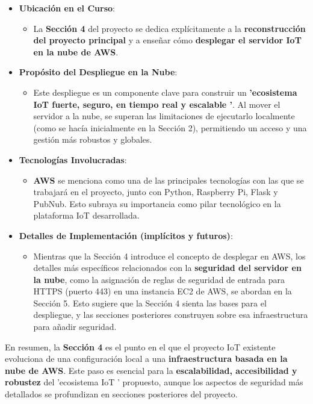 \documentclass{report}
\begin{document}
\begin{itemize}
    \item \textbf{Ubicación en el Curso}:
    \begin{itemize}
        \item La \textbf{Sección 4} del proyecto se dedica explícitamente a la \textbf{reconstrucción del proyecto principal} y a enseñar cómo 
        \textbf{desplegar el servidor IoT en la nube de AWS}.
    \end{itemize}

    \item \textbf{Propósito del Despliegue en la Nube}:
    \begin{itemize}
        \item Este despliegue es un componente clave para construir un \textbf{ 'ecosistema IoT fuerte, seguro, en tiempo real y escalable '}. 
        Al mover el servidor a la nube, se superan las limitaciones de ejecutarlo localmente (como se hacía inicialmente en la Sección 2), 
        permitiendo un acceso y una gestión más robustos y globales.
    \end{itemize}

    \item \textbf{Tecnologías Involucradas}:
    \begin{itemize}
        \item \textbf{AWS} se menciona como una de las principales tecnologías con las que se trabajará en el proyecto, junto con Python, Raspberry Pi, 
        Flask y PubNub. Esto subraya su importancia como pilar tecnológico en la plataforma IoT desarrollada.
    \end{itemize}

    \item \textbf{Detalles de Implementación (implícitos y futuros)}:
    \begin{itemize}
        \item Mientras que la Sección 4 introduce el concepto de desplegar en AWS, los detalles más específicos relacionados con la 
        \textbf{seguridad del servidor en la nube}, como la asignación de reglas de seguridad de entrada para HTTPS (puerto 443) en una instancia EC2 
        de AWS, se abordan en la Sección 5. Esto sugiere que la Sección 4 sienta las bases para el despliegue, y las secciones posteriores construyen 
        sobre esa infraestructura para añadir seguridad.
    \end{itemize}
\end{itemize}
En resumen, la \textbf{Sección 4} es el punto en el que el proyecto IoT existente evoluciona de una configuración local a una \textbf{infraestructura 
basada en la nube de AWS}. Este paso es esencial para la \textbf{escalabilidad, accesibilidad y robustez} del  'ecosistema IoT ' propuesto, aunque los 
aspectos de seguridad más detallados se profundizan en secciones posteriores del proyecto.
\end{document}
